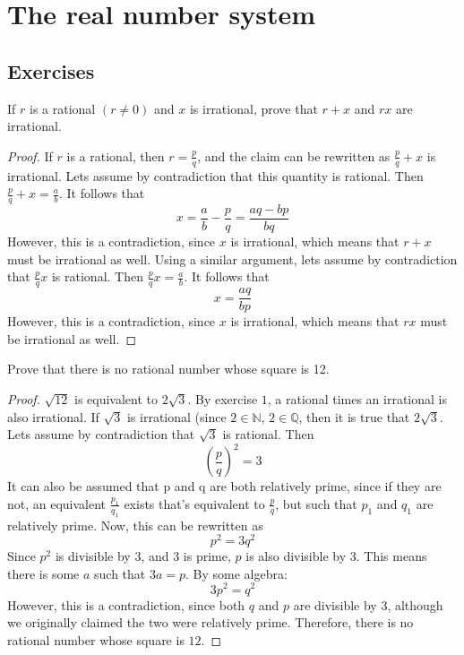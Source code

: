 \documentclass[a4paper]{article}
\begin{document}
\maketitle

\tableofcontents

\section{The real number system}
\subsection{Exercises}
\begin{ex}[1]
If $r$ is a rational $(r \neq 0 )$ and $x$ is irrational, prove that $r + x$ and $rx$ are irrational.

\begin{proof}
If $r$ is a rational, then $r = \frac{p}{q}$, and the claim can be rewritten as $\frac{p}{q} + x$ is irrational. Lets assume by contradiction that this quantity is rational. Then $\frac{p}{q} + x = \frac{a}{b}$. It follows that $$x = \frac{a}{b} - \frac{p}{q} = \frac{aq - bp}{bq}$$ However, this is a contradiction, since $x$ is irrational, which means that $r + x$ must be irrational as well. Using a similar argument, lets assume by contradiction that $\frac{p}{q}x$ is rational. Then $\frac{p}{q}x = \frac{a}{b}$. It follows that $$x = \frac{aq}{bp}$$ However, this is a contradiction, since $x$ is irrational, which means that $rx$ must be irrational as well.
\end{proof}
\end{ex}

\begin{ex}[2]
Prove that there is no rational number whose square is 12.

\begin{proof}
$\sqrt{12}$ is equivalent to $2\sqrt{3}$. By exercise $1$, a rational times an irrational is also irrational. If $\sqrt{3}$ is irrational (since $2 \in \mathbb{N}$, $2 \in \mathbb{Q}$, then it is true that $2\sqrt{3}$. Lets assume by contradiction that $\sqrt{3}$ is rational. Then $$(\frac{p}{q})^2 = 3$$ It can also be assumed that p and q are both relatively prime, since if they are not, an equivalent $\frac{p_1}{q_1}$ exists that's equivalent to $\frac{p}{q}$, but such that $p_1$ and $q_1$ are relatively prime. Now, this can be rewritten as $$p^2 = 3q^2$$ Since $p^2$ is divisible by $3$, and $3$ is prime, $p$ is also divisible by $3$. This means there is some $a$ such that $3a = p$. By some algebra: $$3p^2 = q^2$$ However, this is a contradiction, since both $q$ and $p$ are divisible by 3, although we originally claimed the two were relatively prime. Therefore, there is no rational number whose square is $12$.
\end{proof}
\end{ex}
\end{document}
